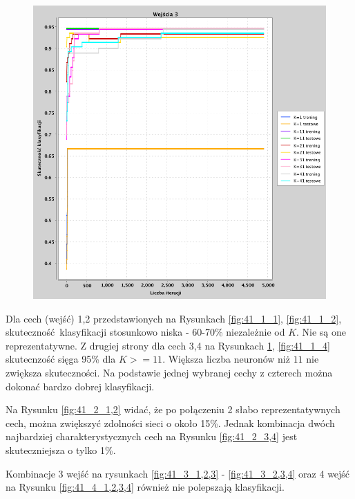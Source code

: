 \documentclass[a4paper, portrait,11pt]{article}
\begin{document}
\begin{figure}[!htb]
\begin{minipage}{0.33\textwidth}
    \caption{\label{fig:41_1_2}}
  \end{minipage}
  \begin{minipage}{0.33\textwidth}
    \centering
    \includegraphics[width=1\linewidth]{../data/classification4/1/1_3.png}
    \caption{\label{fig:41_1_3}}
  \end{minipage}\hfill
\end{figure}

Dla cech (wejść) 1,2 przedstawionych na Rysunkach \ref{fig:41_1_1}, \ref{fig:41_1_2}, 
skuteczność klasyfikacji stosunkowo niska - 60-70\% niezależnie od $K$. 
Nie są one reprezentatywne. Z drugiej strony dla cech 3,4 na Rysunkach \ref{fig:41_1_3}, \ref{fig:41_1_4}
skutecnzość sięga 95\% dla $K >= 11$. Większa liczba neuronów niż $11$ nie zwiększa skuteczności.
Na podstawie jednej wybranej cechy z czterech można dokonać bardzo dobrej klasyfikacji.

Na Rysunku \ref{fig:41_2_1,2} widać, że po połączeniu 2 słabo reprezentatywnych cech,
można zwiększyć zdolności sieci o około 15\%. Jednak kombinacja dwóch najbardziej charakterystycznych cech 
na Rysunku \ref{fig:41_2_3,4} jest skuteczniejsza o tylko 1\%. 

Kombinacje 3 wejść na rysunkach \ref{fig:41_3_1,2,3} - \ref{fig:41_3_2,3,4} oraz 4 wejść na Rysunku \ref{fig:41_4_1,2,3,4} 
również nie polepszają klasyfikacji.
\end{document}
